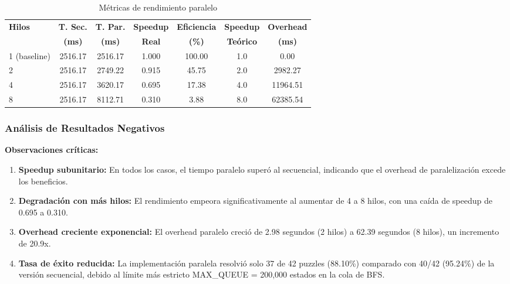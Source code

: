 \documentclass[12pt,a4paper]{article}
\begin{document}
\begin{table}[H]
\centering
\caption{Métricas de rendimiento paralelo}
\label{tab:speedup}
\begin{tabular}{@{}lcccccc@{}}
\toprule
\textbf{Hilos} & \textbf{T. Sec.} & \textbf{T. Par.} & \textbf{Speedup} & \textbf{Eficiencia} & \textbf{Speedup} & \textbf{Overhead} \\
 & \textbf{(ms)} & \textbf{(ms)} & \textbf{Real} & \textbf{(\%)} & \textbf{Teórico} & \textbf{(ms)} \\
\midrule
1 (baseline) & 2516.17 & 2516.17 & 1.000 & 100.00 & 1.0 & 0.00 \\
2 & 2516.17 & 2749.22 & 0.915 & 45.75 & 2.0 & 2982.27 \\
4 & 2516.17 & 3620.17 & 0.695 & 17.38 & 4.0 & 11964.51 \\
8 & 2516.17 & 8112.71 & 0.310 & 3.88 & 8.0 & 62385.54 \\
\bottomrule
\end{tabular}
\end{table}

\subsubsection{Análisis de Resultados Negativos}

\textbf{Observaciones críticas:}

\begin{enumerate}
    \item \textbf{Speedup subunitario:} En todos los casos, el tiempo paralelo superó al secuencial, indicando que el overhead de paralelización excede los beneficios.
    
    \item \textbf{Degradación con más hilos:} El rendimiento empeora significativamente al aumentar de 4 a 8 hilos, con una caída de speedup de 0.695 a 0.310.
    
    \item \textbf{Overhead creciente exponencial:} El overhead paralelo creció de 2.98 segundos (2 hilos) a 62.39 segundos (8 hilos), un incremento de 20.9x.
    
    \item \textbf{Tasa de éxito reducida:} La implementación paralela resolvió solo 37 de 42 puzzles (88.10\%) comparado con 40/42 (95.24\%) de la versión secuencial, debido al límite más estricto MAX\_QUEUE = 200,000 estados en la cola de BFS.
\end{enumerate}
\end{document}
